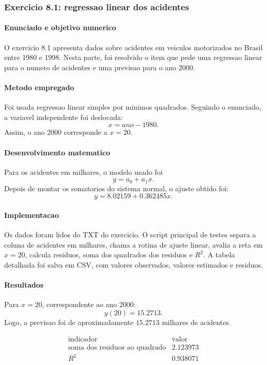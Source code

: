 \documentclass[../main.tex]{subfiles}
\begin{document}
\subsubsection{Exercicio 8.1: regressao linear dos acidentes}

\paragraph{Enunciado e objetivo numerico}
O exercicio 8.1 apresenta dados sobre acidentes em veiculos motorizados no
Brasil entre 1980 e 1998. Nesta parte, foi resolvido o item que pede uma
regressao linear para o numero de acidentes e uma previsao para o ano 2000.

\paragraph{Metodo empregado}
Foi usada regressao linear simples por minimos quadrados. Seguindo o enunciado,
a variavel independente foi deslocada:
\[
    x = ano - 1980.
\]
Assim, o ano 2000 corresponde a \(x=20\).

\paragraph{Desenvolvimento matematico}
Para os acidentes em milhares, o modelo usado foi
\[
    y = a_0 + a_1x.
\]
Depois de montar os somatorios do sistema normal, o ajuste obtido foi:
\[
    y = 8.02159 + 0.362485x.
\]

\paragraph{Implementacao}
Os dados foram lidos do TXT do exercicio. O script principal de testes separa a
coluna de acidentes em milhares, chama a rotina de ajuste linear, avalia a reta
em \(x=20\), calcula residuos, soma dos quadrados dos residuos e \(R^2\). A
tabela detalhada foi salva em CSV, com valores observados, valores estimados e
residuos.

\paragraph{Resultados}
Para \(x=20\), correspondente ao ano 2000:
\[
    y(20)=15.2713.
\]
Logo, a previsao foi de aproximadamente \(15.2713\) milhares de acidentes.

\[
\begin{array}{c|c}
\text{indicador} & \text{valor} \\
\hline
\text{soma dos residuos ao quadrado} & 2.123973 \\
R^2 & 0.938071
\end{array}
\]
\end{document}

